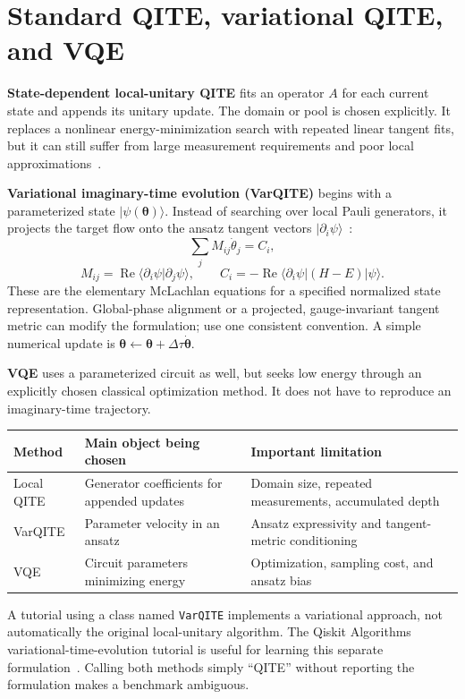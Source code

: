 \documentclass[11pt,a4paper]{article}
\newcommand{\ket}[1]{\lvert #1\rangle}
\newcommand{\bra}[1]{\langle #1\rvert}
\newcommand{\braket}[2]{\langle #1\vert #2\rangle}
\newcommand{\Rea}{\operatorname{Re}}
\newcommand{\dt}{\Delta\tau}
\newcommand{\lesson}[2]{\clearpage\section{#1}\label{#2}}
\begin{document}
\lesson{Standard QITE, variational QITE, and VQE}{sec:varqite}
\textbf{State-dependent local-unitary QITE} fits an operator $A$ for each current state and appends its unitary update. The domain or pool is chosen explicitly. It replaces a nonlinear energy-minimization search with repeated linear tangent fits, but it can still suffer from large measurement requirements and poor local approximations~\cite{motta}.

\textbf{Variational imaginary-time evolution (VarQITE)} begins with a parameterized state $\ket{\psi(\bm\theta)}$. Instead of searching over local Pauli generators, it projects the target flow onto the ansatz tangent vectors $\ket{\partial_i\psi}$~\cite{mcardle,yuan}:
\[
\sum_j M_{ij}\dot\theta_j=C_i,
\]
\[
M_{ij}=\Rea\braket{\partial_i\psi}{\partial_j\psi},\qquad
C_i=-\Rea\bra{\partial_i\psi}(H-E)\ket{\psi}.
\]
These are the elementary McLachlan equations for a specified normalized state representation. Global-phase alignment or a projected, gauge-invariant tangent metric can modify the formulation; use one consistent convention. A simple numerical update is $\bm\theta\leftarrow\bm\theta+\dt\dot{\bm\theta}$.

\textbf{VQE} uses a parameterized circuit as well, but seeks low energy through an explicitly chosen classical optimization method. It does not have to reproduce an imaginary-time trajectory.

\begin{tabularx}{\linewidth}{@{}p{2.4cm}X X@{}}
\toprule
Method & Main object being chosen & Important limitation\\\midrule
Local QITE & Generator coefficients for appended updates & Domain size, repeated measurements, accumulated depth\\
VarQITE & Parameter velocity in an ansatz & Ansatz expressivity and tangent-metric conditioning\\
VQE & Circuit parameters minimizing energy & Optimization, sampling cost, and ansatz bias\\\bottomrule
\end{tabularx}

\begin{caution}
A tutorial using a class named \texttt{VarQITE} implements a variational approach, not automatically the original local-unitary algorithm. The Qiskit Algorithms variational-time-evolution tutorial is useful for learning this separate formulation~\cite{qiskitvar}. Calling both methods simply ``QITE'' without reporting the formulation makes a benchmark ambiguous.
\end{caution}
\end{document}
